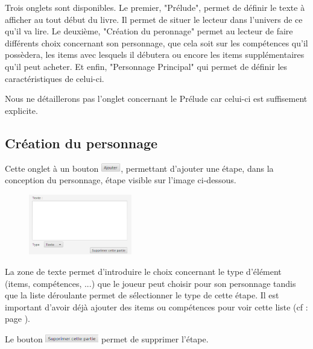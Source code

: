 		Trois onglets sont disponibles. Le premier, "Prélude", permet de définir le texte à afficher au tout début du livre. Il permet de situer le lecteur dans l'univers de ce qu'il va lire. Le deuxième, "Création du peronnage" permet au lecteur de faire différents choix concernant son personnage, que cela soit sur les compétences qu'il possèdera, les items avec lesquels il débutera ou encore les items supplémentaires qu'il peut acheter. Et enfin, "Personnage Principal" qui permet de définir les caractéristiques de celui-ci.

		Nous ne détaillerons pas l'onglet concernant le Prélude car celui-ci est suffisement explicite.

		\subsection{Création du personnage}
			Cette onglet à un bouton \includegraphics[height=10pt, keepaspectratio]{img/ajouterBouton.png}, permettant d'ajouter une étape, dans la conception du personnage, étape visible sur l'image ci-dessous.

			\begin{figure}[H]
				\centering\includegraphics[width=0.4\textwidth, keepaspectratio]{img/etapeConceptionPerso.png}
			\end{figure}

			La zone de texte permet d'introduire le choix concernant le type d'élément (items, compétences, ...) que le joueur peut choisir pour son personnage tandis que la liste déroulante permet de sélectionner le type de cette étape. Il est important d'avoir déjà ajouter des items ou compétences pour voir cette liste (cf :  page \pageref{chapter:elementsConstitutifLivre}).

			Le bouton \includegraphics[height=10pt, keepaspectratio]{img/preludeSupprimerBouton.png} permet de supprimer l'étape.

